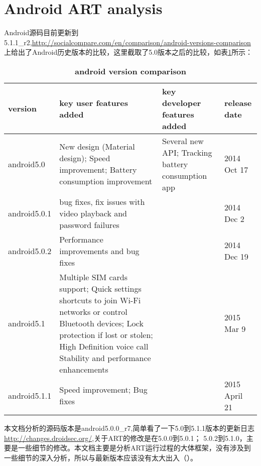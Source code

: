 \section{Android ART analysis}
Android源码目前更新到5.1.1\_r2,\url{http://socialcompare.com/en/comparison/android-versions-comparison}
上给出了Android历史版本的比较，这里截取了5.0版本之后的比较，如表\ref{androidcompare}所示：
\begin{table}[H]
\caption{\label{androidcompare}\textbf{android version comparison}}
\begin{tabular}{|p{2cm}|p{5cm}|p{3.5cm}|p{2.5cm}|}
\hline
version & key user features added & key developer features added & release date\\
\hline
android5.0 & New design (Material design); 
Speed improvement; 
Battery consumption improvement 
& Several new API; 
Tracking battery consumption app & 2014 Oct 17\\
\hline
android5.0.1 & bug fixes, fix issues with video playback and password failures & & 2014 Dec 2\\
\hline
android5.0.2 & Performance improvements and bug fixes & & 2014 Dec 19\\
\hline
android5.1 & Multiple SIM cards support;
Quick settings shortcuts to join Wi-Fi networks or control Bluetooth devices;
Lock protection if lost or stolen;
High Definition voice call
Stability and performance enhancements & & 2015 Mar 9\\
\hline
android5.1.1 & Speed improvement;
Bug fixes & & 2015 April 21\\
\hline
\end{tabular}
\end{table}

本文档分析的源码版本是android5.0.0\_r7,简单看了一下5.0到5.1.1版本的更新日志
\url{http://changes.droidsec.org/},关于ART的修改是在5.0.0到5.0.1；
5.0.2到5.1.0，主要是一些细节的修改。本文档主要是分析ART运行过程的大体框架，没有涉及到
一些细节的深入分析，所以与最新版本应该没有太大出入（）。

